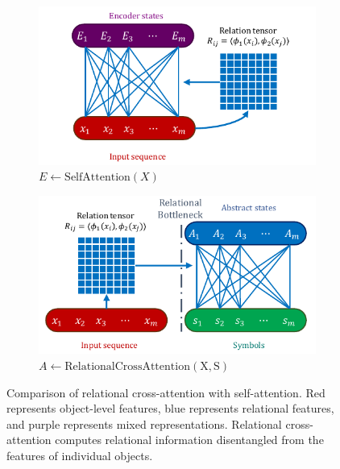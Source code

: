 \begin{figure}
    \begin{subfigure}[b]{0.5\textwidth}
        \centering
        \includegraphics[width=\textwidth]{figures/self_attn_fig.pdf}
        \caption{$E \gets \mathrm{SelfAttention}(X)$}\label{fig:self_attention}
    \end{subfigure}
    \hfill
    \begin{subfigure}[b]{0.5\textwidth}
        \centering
        \includegraphics[width=\textwidth]{figures/rel_crossattn_fig.pdf}
        \caption{$A \gets \mathrm{RelationalCrossAttention(X, S)}$}\label{fig:relational_cross_attention}
    \end{subfigure}
    \caption{Comparison of relational cross-attention with self-attention. Red represents object-level features, blue represents relational features, and purple represents mixed representations. Relational cross-attention computes relational information disentangled from the features of individual objects.}\label{fig:attn_mechanisms}
    \vskip-10pt
\end{figure}

